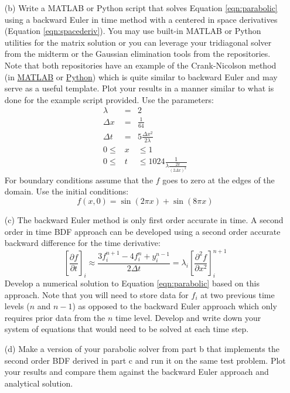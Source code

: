 \documentclass{article}
\begin{document}
\begin{enumerate}
\begin{enumerate}
    \item[(b)]  Write a MATLAB or Python script that solves Equation \ref{eqn:parabolic} using a backward Euler in time method with a centered in space derivatives (Equation \ref{eqn:spacederiv}).  You may use built-in MATLAB or Python utilities for the matrix solution or you can leverage your tridiagonal solver from the midterm or the Gaussian elimination tools from the repositories.  Note that both repositories have an example of the Crank-Nicolson method (in \href{https://github.com/Zettergren-Courses/EP501_matlab/blob/master/PDEs/parabolic.m}{MATLAB} or \href{https://github.com/Zettergren-Courses/EP501_matlab/blob/master/PDEs/parabolic.m}{Python}) which is quite similar to backward Euler and may serve as a useful template.  Plot your results in a manner similar to what is done for the example script provided.  Use the parameters:
    \begin{eqnarray}
      \lambda &=& 2 \\
      \Delta x &=& \frac{1}{64} \\
      \Delta t &=& 5 \frac{\Delta x^2}{2 \lambda} \\
      0 \le &x& \le 1 \\
      0 \le &t& \le 1024 \frac{1}{ \lambda \frac{2 \pi}{\left( 2 \Delta x \right)^2} }
    \end{eqnarray}
    For boundary conditions assume that the $f$ goes to zero at the edges of the domain.  Use the initial conditions:
    \begin{equation}
      f(x,0)=\sin (2 \pi x) + \sin (8 \pi x)
    \end{equation}
    \item[(c)]  The backward Euler method is only first order accurate in time.  A second order in time BDF approach can be developed using a second order accurate backward difference for the time derivative:
    \begin{equation}
      \left[ \frac{\partial f}{\partial t} \right]_i \approx \frac{3f_i^{n+1} - 4f_i^n + y_i^{n-1}}{2 \Delta t} =  \lambda_i \left[ \frac{\partial^2 f}{\partial x^2} \right]_i^{n+1}
    \end{equation}
    Develop a numerical solution to Equation \ref{eqn:parabolic} based on this approach.  Note that you will need to store data for $f_i$ at two previous time levels ($n$ and $n-1$) as opposed to the backward Euler approach which only requires prior data from the $n$ time level.  Develop and write down your system of equations that would need to be solved at each time step.  
    \item[(d)]  Make a version of your parabolic solver from part b that implements the second order BDF derived in part c and run it on the same test problem.  Plot your results and compare them against the backward Euler approach and analytical solution.  
  \end{enumerate}

    
\end{enumerate}
\end{document}
